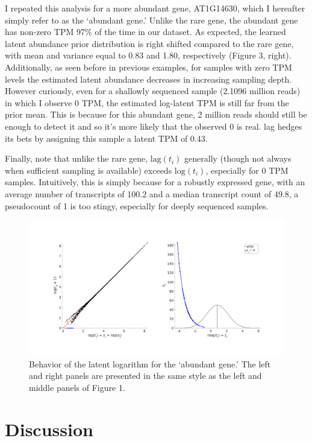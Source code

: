 \documentclass[11pt]{article}
\begin{document}
I repeated this analysis for a more abundant gene, AT1G14630, which I hereafter simply refer to as the `abundant gene.' Unlike the rare gene, the abundant gene has non-zero TPM 97$\%$ of the time in our dataset. As expected, the learned latent abundance prior distribution is right shifted compared to the rare gene, with mean and variance equal to 0.83 and 1.80, respectively (Figure 3, right). Additionally, as seen before in previous examples, for samples with zero TPM levels the estimated latent abundance decreases in increasing sampling depth. However curiously, even for a shallowly sequenced sample (2.1096 million reads) in which I observe 0 TPM, the estimated log-latent TPM is still far from the prior mean. This is because for this abundant gene, 2 million reads should still be enough to detect it and so it's more likely that the observed 0 is real. lag hedges its bets by assigning this sample a latent TPM of 0.43.

Finally, note that unlike the rare gene, $\textrm{lag}(t_i)$ generally (though not always when sufficient sampling is available) exceeds $\textrm{log}(t_i)$, especially for 0 TPM samples. Intuitively, this is simply because for a robustly expressed gene, with an average number of transcripts of 100.2 and a median transcript count of 49.8, a pseudocount of 1 is too stingy, especially for deeply sequenced samples.
 

\begin{figure}[h]
\centering
\includegraphics[trim={1cm 3cm 1cm 2cm},clip,width=\textwidth]{figure3.png}
\caption{Behavior of the latent logarithm for the `abundant gene.' The left and right panels are presented in the same style as the left and middle panels of Figure 1.}
\end{figure}

\section{Discussion}
\end{document}
